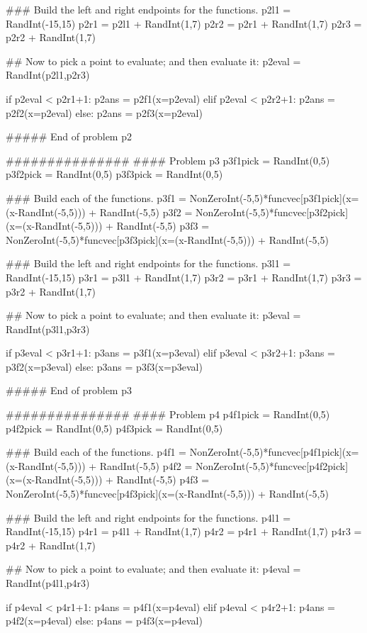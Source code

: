\documentclass{ximera}
\begin{document}
\begin{sagesilent}
### Build the left and right endpoints for the functions.
p2l1 = RandInt(-15,15)
p2r1 = p2l1 + RandInt(1,7)
p2r2 = p2r1 + RandInt(1,7)
p2r3 = p2r2 + RandInt(1,7)

## Now to pick a point to evaluate; and then evaluate it:
p2eval = RandInt(p2l1,p2r3)

if p2eval < p2r1+1:
    p2ans = p2f1(x=p2eval)
elif p2eval < p2r2+1:
    p2ans = p2f2(x=p2eval)
else:
    p2ans = p2f3(x=p2eval)


##### End of problem p2




###############
#### Problem p3
p3f1pick = RandInt(0,5)
p3f2pick = RandInt(0,5)
p3f3pick = RandInt(0,5)

### Build each of the functions.
p3f1 = NonZeroInt(-5,5)*funcvec[p3f1pick](x=(x-RandInt(-5,5))) + RandInt(-5,5)
p3f2 = NonZeroInt(-5,5)*funcvec[p3f2pick](x=(x-RandInt(-5,5))) + RandInt(-5,5)
p3f3 = NonZeroInt(-5,5)*funcvec[p3f3pick](x=(x-RandInt(-5,5))) + RandInt(-5,5)

### Build the left and right endpoints for the functions.
p3l1 = RandInt(-15,15)
p3r1 = p3l1 + RandInt(1,7)
p3r2 = p3r1 + RandInt(1,7)
p3r3 = p3r2 + RandInt(1,7)

## Now to pick a point to evaluate; and then evaluate it:
p3eval = RandInt(p3l1,p3r3)

if p3eval < p3r1+1:
    p3ans = p3f1(x=p3eval)
elif p3eval < p3r2+1:
    p3ans = p3f2(x=p3eval)
else:
    p3ans = p3f3(x=p3eval)


##### End of problem p3




###############
#### Problem p4
p4f1pick = RandInt(0,5)
p4f2pick = RandInt(0,5)
p4f3pick = RandInt(0,5)

### Build each of the functions.
p4f1 = NonZeroInt(-5,5)*funcvec[p4f1pick](x=(x-RandInt(-5,5))) + RandInt(-5,5)
p4f2 = NonZeroInt(-5,5)*funcvec[p4f2pick](x=(x-RandInt(-5,5))) + RandInt(-5,5)
p4f3 = NonZeroInt(-5,5)*funcvec[p4f3pick](x=(x-RandInt(-5,5))) + RandInt(-5,5)

### Build the left and right endpoints for the functions.
p4l1 = RandInt(-15,15)
p4r1 = p4l1 + RandInt(1,7)
p4r2 = p4r1 + RandInt(1,7)
p4r3 = p4r2 + RandInt(1,7)

## Now to pick a point to evaluate; and then evaluate it:
p4eval = RandInt(p4l1,p4r3)

if p4eval < p4r1+1:
    p4ans = p4f1(x=p4eval)
elif p4eval < p4r2+1:
    p4ans = p4f2(x=p4eval)
else:
    p4ans = p4f3(x=p4eval)



\end{sagesilent}
\end{document}
